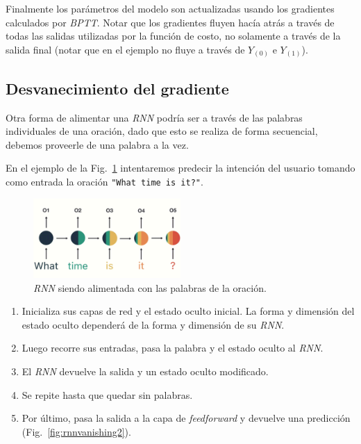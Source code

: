\documentclass[a4paper,12pt]{article}
\begin{document}
Finalmente los parámetros del modelo son actualizadas usando los gradientes calculados por \textit{BPTT}. Notar que los gradientes fluyen hacía atrás a través de todas las salidas utilizadas por la función de costo, no solamente a través de la salida final (notar que en el ejemplo no fluye a través de $Y_{(0)}$ e $Y_{(1)}$).

\subsection{Desvanecimiento del gradiente}

Otra forma de alimentar una \textit{RNN} podría ser a través de las palabras individuales de una oración, dado que esto se realiza de forma secuencial, debemos proveerle de una palabra a la vez.

En el ejemplo de la Fig.~\ref{fig:rnnvanishing1} intentaremos predecir la intención del usuario tomando como entrada la oración \texttt{"What time is it?"}\citep{phi:rnn}.

\begin{figure}[H]
	\begin{center}				
		\includegraphics[width=0.5\textwidth]{vanishing1.png}
		\caption{\textit{RNN} siendo alimentada con las palabras de la oración. \citep{phi:rnn}}
		\label{fig:rnnvanishing1}
	\end{center}
\end{figure}

\begin{enumerate}[noitemsep, topsep=2pt]
	\item Inicializa sus capas de red y el estado oculto inicial. La forma y dimensión del estado oculto dependerá de la forma y dimensión de su \textit{RNN}.
	\item Luego recorre sus entradas, pasa la palabra y el estado oculto al \textit{RNN}.
	\item El \textit{RNN} devuelve la salida y un estado oculto modificado.
	\item Se repite hasta que quedar sin palabras.
	\item Por último, pasa la salida a la capa de \textit{feedforward} y devuelve una predicción (Fig.~\ref{fig:rnnvanishing2}).
\end{enumerate}
\end{document}
